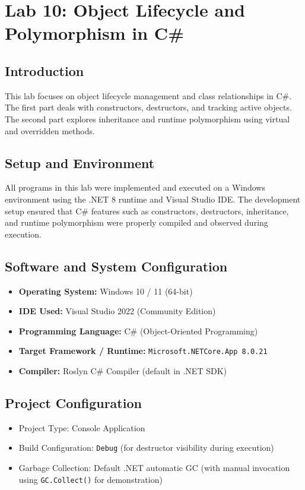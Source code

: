 \section{Lab 10: Object Lifecycle and Polymorphism in C\#}

\subsection{Introduction}
This lab focuses on object lifecycle management and class relationships in C\#. 
The first part deals with constructors, destructors, and tracking active objects. 
The second part explores inheritance and runtime polymorphism using virtual and overridden methods.

\subsection{Setup and Environment}

All programs in this lab were implemented and executed on a Windows environment using the .NET 8 runtime and Visual Studio IDE. The development setup ensured that C\# features such as constructors, destructors, inheritance, and runtime polymorphism were properly compiled and observed during execution.

\subsection*{Software and System Configuration}

\begin{itemize}
    \item \textbf{Operating System:} Windows 10 / 11 (64-bit)
    \item \textbf{IDE Used:} Visual Studio 2022 (Community Edition)
    \item \textbf{Programming Language:} C\# (Object-Oriented Programming)
    \item \textbf{Target Framework / Runtime:} \texttt{Microsoft.NETCore.App 8.0.21}
    \item \textbf{Compiler:} Roslyn C\# Compiler (default in .NET SDK)
\end{itemize}

\subsection*{Project Configuration}
\begin{itemize}
    \item Project Type: Console Application
    \item Build Configuration: \texttt{Debug} (for destructor visibility during execution)
    \item Garbage Collection: Default .NET automatic GC (with manual invocation using 
    \texttt{GC.Collect()} for demonstration)
\end{itemize}


